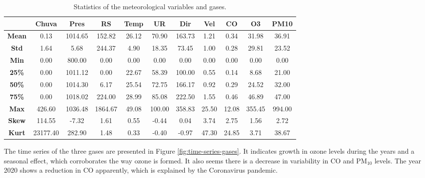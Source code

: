 \begin{table*}[t]
    \centering
    \begin{tabular}{|c|c|c|c|c|c|c|c|c|c|c|}
        \hline
        {} & {\bf Chuva} &  {\bf Pres} & {\bf RS} & {\bf Temp} & {\bf UR} &
        {\bf Dir} & {\bf Vel} & {\bf CO} & {\bf O3} & {\bf PM10} \\
        \hline
        {\bf Mean}  &       0.13 &    1014.65 &     152.82 &      26.12 &      70.90
        &     163.73 &       1.21 &       0.34 &      31.98 &      36.91 \\
        \hline
        {\bf Std}   &       1.64 &       5.68 &     244.37 &       4.90 &      18.35
        &      73.45 &       1.00 &       0.28 &      29.81 &      23.52 \\
        \hline
        {\bf Min}   &       0.00 &     800.00 &       0.00 &       0.00 &       0.00
        &       0.00 &       0.00 &       0.00 &       0.00 &       0.00 \\
        \hline
        {\bf 25\%}   &       0.00 &    1011.12 &       0.00 &      22.67 &
        58.39 &     100.00 &       0.55 &       0.14 &       8.68 &      21.00
        \\
        \hline
        {\bf 50\%}   &       0.00 &    1014.30 &       6.17 &      25.54 &
        72.75 &     166.17 &       0.92 &       0.29 &      24.52 &      32.00
        \\
        \hline
        {\bf 75\%}   &       0.00 &    1018.02 &     224.00 &      28.99 &
        85.08 &     222.50 &       1.55 &       0.46 &      46.89 &      47.00
        \\
        \hline
        {\bf Max}   &     426.60 &    1036.48 &    1864.67 &      49.08 &     100.00
        &     358.83 &      25.50 &      12.08 &     355.45 &     994.00 \\
        \hline
        {\bf Skew}  &     114.55 &      -7.32 &       1.61 &       0.55 &      -0.44
        &       0.04 &       3.74 &       2.75 &       1.56 &       2.72 \\
        \hline
        {\bf Kurt}  &   23177.40 &     282.90 &       1.48 &       0.33 &      -0.40
        &      -0.97 &      47.30 &      24.85 &       3.71 &      38.67 \\
        \hline
    \end{tabular}
    \caption{Statistics of the meteorological variables and gases.}
    \label{tab:statistics-variables}
\end{table*}


The time series of the three gases are presented in Figure
\ref{fig:time-series-gases}. It indicates growth in ozone levels during the
years and a seasonal effect, which corroborates the way ozone is formed.  It
also seems there is a decrease in variability in CO and PM$_{10}$ levels. The
year 2020 shows a reduction in CO apparently, which is explained by the
Coronavirus pandemic. 

